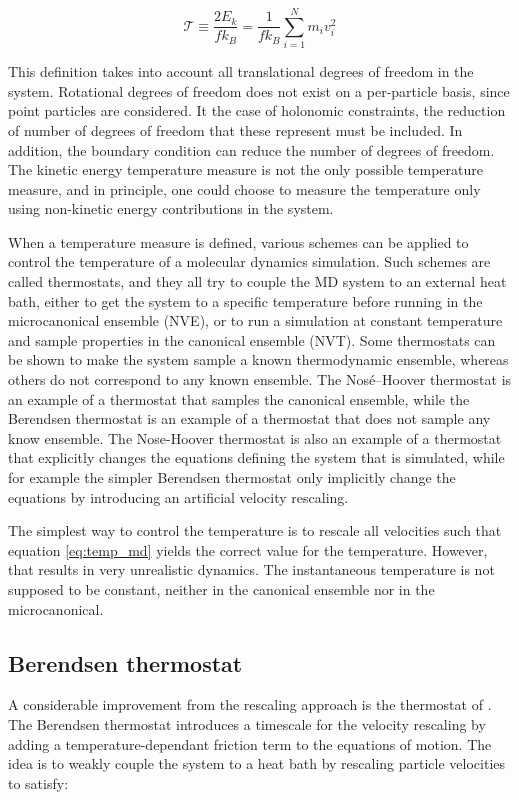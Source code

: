 \begin{equation}
	\mathcal{T} \equiv \frac{2E_k}{f k_B} = \frac{1}{f k_B}\sum_{i=1}^{N} m_iv_i^2
	\label{eq:temp_md}
\end{equation}

This definition takes into account all translational degrees of freedom in the system. Rotational degrees of freedom does not exist on a per-particle basis, since point particles are considered. It the case of holonomic constraints, the reduction of number of degrees of freedom that these represent must be included. In addition, the boundary condition can reduce the number of degrees of freedom. The kinetic energy temperature measure is not the only possible temperature measure, and in principle, one could choose to measure the temperature only using non-kinetic energy contributions in the system. 

When a temperature measure is defined, various schemes can be applied to control the temperature of a molecular dynamics simulation. Such schemes are called thermostats, and they all try to couple the MD system to an external heat bath, either to get the system to a specific temperature before running in the microcanonical ensemble (NVE), or to run a simulation at constant temperature and sample properties in the canonical ensemble (NVT). Some thermostats can be shown to make the system sample a known thermodynamic ensemble, whereas others do not correspond to any known ensemble. The Nosé--Hoover thermostat is an example of a thermostat that samples the canonical ensemble, while the Berendsen thermostat is an example of a thermostat that does not sample any know ensemble. The Nose-Hoover thermostat is also an example of a thermostat that explicitly changes the equations defining the system that is simulated, while for example the simpler Berendsen thermostat only implicitly change the equations by introducing an artificial velocity rescaling. 

The simplest way to control the temperature is to rescale all velocities such that equation \ref{eq:temp_md} yields the correct value for the temperature. However, that results in very unrealistic dynamics. The instantaneous temperature is not supposed to be constant, neither in the canonical ensemble nor in the microcanonical. 

\subsection{Berendsen thermostat}
A considerable improvement from the rescaling approach is the thermostat of \citet{Berendsen1984}. The Berendsen thermostat introduces a timescale for the velocity rescaling by adding a temperature-dependant friction term to the equations of motion. The idea is to weakly couple the system to a heat bath by rescaling particle velocities to satisfy:

